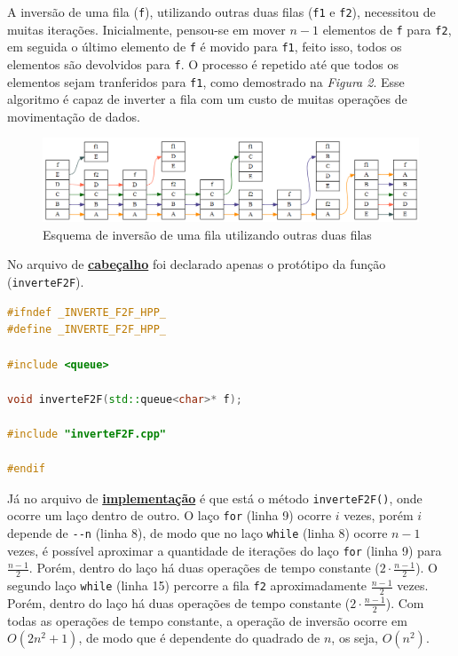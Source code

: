 \documentclass[
  brazilian,
  paper=a4,
  oneside  ,captions=tableheading
]{scrbook}
\newcommand{\passthrough}[1]{#1}
\begin{document}
A inversão de uma fila (\passthrough{\lstinline!f!}), utilizando outras
duas filas (\passthrough{\lstinline!f1!} e
\passthrough{\lstinline!f2!}), necessitou de muitas iterações.
Inicialmente, pensou-se em mover \(n-1\) elementos de
\passthrough{\lstinline!f!} para \passthrough{\lstinline!f2!}, em
seguida o último elemento de \passthrough{\lstinline!f!} é movido para
\passthrough{\lstinline!f1!}, feito isso, todos os elementos são
devolvidos para \passthrough{\lstinline!f!}. O processo é repetido até
que todos os elementos sejam tranferidos para
\passthrough{\lstinline!f1!}, como demostrado na \emph{Figura 2}. Esse
algoritmo é capaz de inverter a fila com um custo de muitas operações de
movimentação de dados.

\begin{figure}
\hypertarget{Fig:2}{%
\centering
\includegraphics{inverteF2F.png}
\caption{Esquema de inversão de uma fila utilizando outras duas
filas}\label{Fig:2}
}
\end{figure}

No arquivo de
\href{https://github.com/ecostadelle/lista_pilhas_filas/blob/main/include/inverteF2F.hpp}{\textbf{cabeçalho}}
foi declarado apenas o protótipo da função
(\passthrough{\lstinline!inverteF2F!}).

\begin{lstlisting}[language={C++}]
#ifndef _INVERTE_F2F_HPP_
#define _INVERTE_F2F_HPP_

#include <queue>

void inverteF2F(std::queue<char>* f);

#include "inverteF2F.cpp"

#endif  
\end{lstlisting}

Já no arquivo de
\href{https://github.com/ecostadelle/lista_pilhas_filas/blob/main/include/inverteF2F.cpp}{\textbf{implementação}}
é que está o método \passthrough{\lstinline!inverteF2F()!}, onde ocorre
um laço dentro de outro. O laço \passthrough{\lstinline!for!} (linha 9)
ocorre \(i\) vezes, porém \(i\) depende de \passthrough{\lstinline!--n!}
(linha 8), de modo que no laço \passthrough{\lstinline!while!} (linha 8)
ocorre \(n-1\) vezes, é possível aproximar a quantidade de iterações do
laço \passthrough{\lstinline!for!} (linha 9) para \(\frac{n-1}{2}\).
Porém, dentro do laço há duas operações de tempo constante
(\(2 \cdot \frac{n-1}{2}\)). O segundo laço
\passthrough{\lstinline!while!} (linha 15) percorre a fila
\passthrough{\lstinline!f2!} aproximadamente \(\frac{n-1}{2}\) vezes.
Porém, dentro do laço há duas operações de tempo constante
(\(2 \cdot \frac{n-1}{2}\)). Com todas as operações de tempo constante,
a operação de inversão ocorre em \(O(2n^2 +1)\), de modo que é
dependente do quadrado de \(n\), os seja, \(O(n^2)\).
\end{document}
